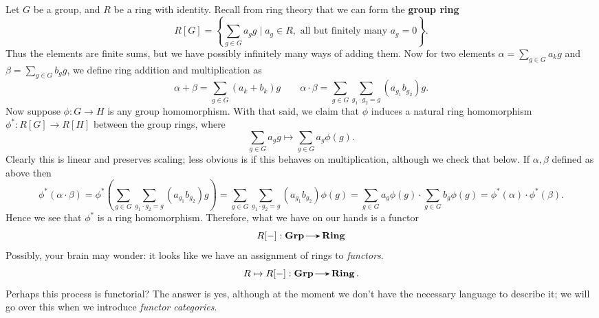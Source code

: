     \begin{example}\label{example:group_ring_functor}
        Let $G$ be a group, and $R$ be a ring with identity. Recall 
        from ring theory that we can form the \textbf{group ring}
        \[
            R[G] = \left\{ \sum_{g \in G}a_gg\mid a_g \in R, \text{ all but finitely many } a_g = 0 \right\}.
        \]
        Thus the elements are finite sums, but we have possibly infinitely many ways 
        of adding them. Now 
        for two elements $\displaystyle \alpha = \sum_{g \in G}a_kg$ and 
        $\displaystyle \beta = \sum_{g \in G}b_gg$, we define ring addition and multiplication 
        as 
        \[
            \alpha + \beta = \sum_{g \in G}(a_k + b_k)g
            \qquad 
            \alpha \cdot \beta 
            = 
            \sum_{g \in G}\sum_{g_1 \cdot g_2 = g}(a_{g_1}b_{g_2})g.
        \]
        Now suppose $\phi: G \to H$ is any group homomorphism.
        With that said, we claim that $\phi$ induces a
        natural ring homomorphism $\phi^{*}: R[G] \to R[H]$
        between the group rings, where 
        \[
            \sum_{g\in G}a_gg \mapsto \sum_{g \in G}a_g \phi(g). 
        \]
        Clearly this is linear and preserves scaling; less obvious is if 
        this behaves on multiplication, although we check that below.
        If $\alpha, \beta$ defined as above then 
        \[
            \phi^*( \alpha \cdot \beta )
            =
            \phi^*\left( \sum_{g \in G}\sum_{g_1 \cdot g_2 = g}(a_{g_1}b_{g_2})g \right)
            =
            \sum_{g \in G}\sum_{g_1 \cdot g_2 = g}(a_{g_1}b_{g_2})\phi(g)
            =
            \sum_{g \in G}a_g\phi(g)\cdot
            \sum_{g \in G}b_g\phi(g)
            =
            \phi^*(\alpha)\cdot\phi^*(\beta).
        \]
        Hence we see that $\phi^*$ is a ring homomorphism. Therefore, 
        what we have on our hands is a functor 
        \[
            R[-]: \grp \to \ring  
        \]
        Possibly, your brain may wonder: it looks like we have an assignment 
        of rings to \emph{functors}. 
        \[
            R \mapsto R[-]: \grp \to \ring.
        \]
        Perhaps this process is functorial? The answer is yes, although 
        at the moment we don't have the necessary language to describe it; 
        we will go over this when we introduce \emph{functor categories}.
    \end{example}
    \vspace{0.5cm}

